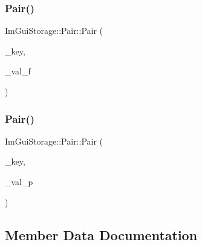 \mbox{\label{struct_im_gui_storage_1_1_pair_a6f63f598513f2a7a57f2e9ea3b0137b9}} 
\subsubsection{\texorpdfstring{Pair()}{Pair()}\hspace{0.1cm}{\footnotesize\ttfamily [2/3]}}
{\footnotesize\ttfamily Im\+Gui\+Storage\+::\+Pair\+::\+Pair (\begin{DoxyParamCaption}\item[{\mbox{\hyperlink{imgui_8h_a1785c9b6f4e16406764a85f32582236f}{Im\+Gui\+ID}}}]{\+\_\+key,  }\item[{float}]{\+\_\+val\+\_\+f }\end{DoxyParamCaption})\hspace{0.3cm}{\ttfamily [inline]}}

\mbox{\label{struct_im_gui_storage_1_1_pair_a4d07d60f83b4e24ee8be9ccceaab76bd}} 
\subsubsection{\texorpdfstring{Pair()}{Pair()}\hspace{0.1cm}{\footnotesize\ttfamily [3/3]}}
{\footnotesize\ttfamily Im\+Gui\+Storage\+::\+Pair\+::\+Pair (\begin{DoxyParamCaption}\item[{\mbox{\hyperlink{imgui_8h_a1785c9b6f4e16406764a85f32582236f}{Im\+Gui\+ID}}}]{\+\_\+key,  }\item[{void $\ast$}]{\+\_\+val\+\_\+p }\end{DoxyParamCaption})\hspace{0.3cm}{\ttfamily [inline]}}



\subsection{Member Data Documentation}
\mbox{\label{struct_im_gui_storage_1_1_pair_a59f447bb1e6c85a5fe325b914b832173}} 
